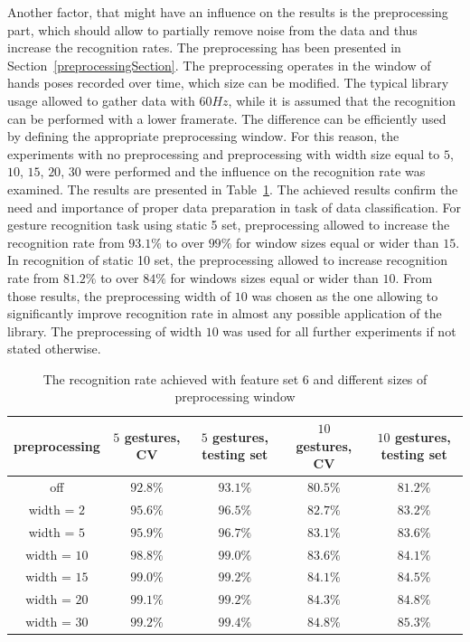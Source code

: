 Another factor, that might have an influence on the results is the preprocessing part, which should allow to partially remove noise from the data and thus increase the recognition rates. 
The preprocessing has been presented in Section~\ref{preprocessingSection}.
The preprocessing operates in the window of hands poses recorded over time, which size can be modified. 
The typical library usage allowed to gather data with $60Hz$, while it is assumed that the recognition can be performed with a lower framerate. The difference can be efficiently used by defining the appropriate preprocessing window.
For this reason, the experiments with no preprocessing and preprocessing with width size equal to $5$, $10$, $15$, $20$, $30$ were performed and the influence on the recognition rate was examined.
The results are presented in Table~\ref{staticpre}.
The achieved results confirm the need and importance of proper data preparation in task of data classification.
For gesture recognition task using static 5 set, preprocessing allowed to increase the recognition rate from $93.1\%$ to over $99\%$ for window sizes equal or wider than $15$. 
In recognition of static 10 set, the preprocessing allowed to increase recognition rate from $81.2\%$ to over $84\%$ for windows sizes equal or wider than $10$.
From those results, the preprocessing width of $10$ was chosen as the one allowing to significantly improve recognition rate in almost any possible application of the library.
The preprocessing of width $10$ was used for all further experiments if not stated otherwise.

\begin{table}[htp!]
\begin{center}
	\label{staticpre}
	\caption{The recognition rate achieved with feature set $6$ and different sizes of preprocessing window}
    \begin{tabular}{ccccc}
    \hline
    preprocessing                                                   & $5$ gestures, CV & $5$ gestures, testing set & $10$ gestures, CV  & $10$ gestures, testing set \\ \hline
    off                     & $92.8\%$ & $93.1\%$  & $80.5\%$ & $81.2\%$ \\ \hline
    width = $2$               & $95.6\%$ & $96.5\%$  & $82.7\%$ & $83.2\%$ \\ \hline
    width = $5$               & $95.9\%$ & $96.7\%$  & $83.1\%$ & $83.6\%$ \\ \hline
    width = $10$              & $98.8\%$ & $99.0\%$  & $83.6\%$ & $84.1\%$ \\ \hline
    width = $15$              & $99.0\%$ & $99.2\%$  & $84.1\%$ & $84.5\%$ \\ \hline
    width = $20$              & $99.1\%$ & $99.2\%$  & $84.3\%$ & $84.8\%$ \\ \hline
    width = $30$              & $99.2\%$ & $99.4\%$  & $84.8\%$ & $85.3\%$ \\ \hline
    \end{tabular}
    \end{center}
\end{table}

